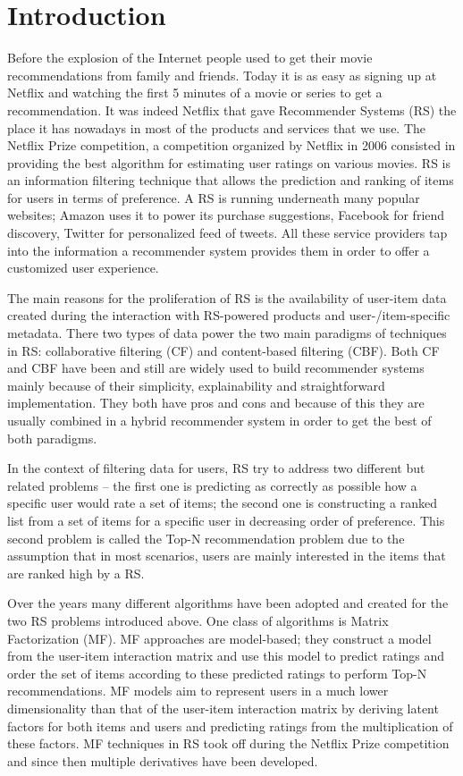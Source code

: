 \chapter{Introduction}
\label{Introduction}
\thispagestyle{empty}

\noindent Before the explosion of the Internet people used to get their movie recommendations from family and friends. Today it is as easy as signing up at Netflix and watching the first 5 minutes of a movie or series to get a recommendation. It was indeed Netflix that gave Recommender Systems (RS) the place it has nowadays in most of the products and services that we use. The Netflix Prize competition, a competition organized by Netflix in 2006 consisted in providing the best algorithm for estimating user ratings on various movies. RS is an information filtering technique \cite{zhang2019deep} that allows the prediction and ranking of items for users in terms of preference. A RS is running underneath many popular websites; Amazon uses it to power its purchase suggestions, Facebook for friend discovery, Twitter for personalized feed of tweets. All these service providers tap into the information a recommender system provides them in order to offer a customized user experience.

The main reasons for the proliferation of RS is the availability of user-item data created during the interaction with RS-powered products and user-/item-specific metadata. There two types of data power the two main paradigms of techniques in RS: collaborative filtering (CF) and content-based filtering (CBF). Both CF and CBF have been and still are widely used to build recommender systems mainly because of their simplicity, explainability and straightforward implementation. They both have pros and cons and because of this they are usually combined in a hybrid recommender system in order to get the best of both paradigms. 

In the context of filtering data for users, RS try to address two different but related problems -- the first one is predicting as correctly as possible how a specific user would rate a set of items; the second one is constructing a ranked list from a set of items for a specific user in decreasing order of preference. This second problem is called the Top-N recommendation problem due to the assumption that in most scenarios, users are mainly interested in the items that are ranked high by a RS.

Over the years many different algorithms have been adopted and created for the two RS problems introduced above. One class of algorithms is Matrix Factorization (MF). MF approaches are model-based; they construct a model from the user-item interaction matrix and use this model to predict ratings and order the set of items according to these predicted ratings to perform Top-N recommendations. MF models aim to represent users in a much lower dimensionality than that of the user-item interaction matrix by deriving latent factors for both items and users and predicting ratings from the multiplication of these factors. MF techniques in RS took off during the Netflix Prize competition and since then multiple derivatives have been developed.

